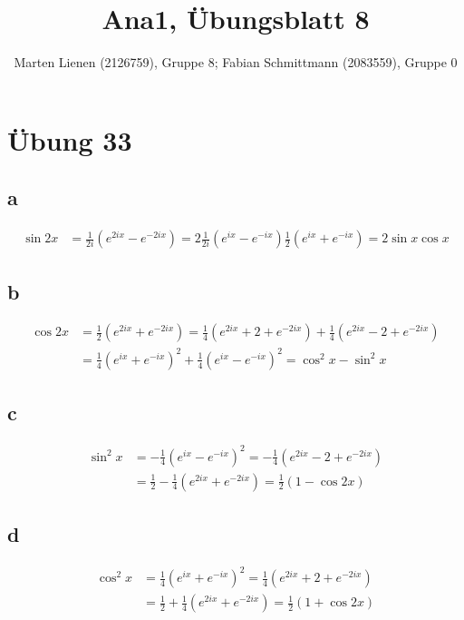 \documentclass[a4paper,10pt]{article}
\title{Ana1, Übungsblatt 8}
\author{Marten Lienen (2126759), Gruppe 8; Fabian Schmittmann (2083559), Gruppe 0}
\begin{document}
\maketitle

\section*{Übung 33}

\subsection*{a}

\begin{align*}
 \sin{2x} & = \frac{1}{2i}(e^{2ix} - e^{-2ix}) = 2\frac{1}{2i}(e^{ix} - e^{-ix})\frac{1}{2}(e^{ix} + e^{-ix}) = 2\sin{x}\cos{x}
\end{align*}

\subsection*{b}

\begin{align*}
 \cos{2x} & = \frac{1}{2}(e^{2ix} + e^{-2ix}) = \frac{1}{4}(e^{2ix} + 2 + e^{-2ix}) + \frac{1}{4}(e^{2ix} - 2 + e^{-2ix}) \\
 & = \frac{1}{4}(e^{ix} + e^{-ix})^2 + \frac{1}{4}(e^{ix} - e^{-ix})^2 = \cos^2 x - \sin^2 x
\end{align*}

\subsection*{c}

\begin{align*}
 \sin^2 x & = -\frac{1}{4}(e^{ix} - e^{-ix})^2 = -\frac{1}{4}(e^{2ix} - 2 + e^{-2ix})\\
 & = \frac{1}{2} - \frac{1}{4}(e^{2ix} + e^{-2ix})= \frac{1}{2}(1 - \cos 2x)
\end{align*}

\subsection*{d}

\begin{align*}
 \cos^2 x & = \frac{1}{4}(e^{ix} + e^{-ix})^2 = \frac{1}{4}(e^{2ix} + 2 + e^{-2ix})\\
 & = \frac{1}{2} + \frac{1}{4}(e^{2ix} + e^{-2ix}) = \frac{1}{2}(1 + \cos 2x)
\end{align*}
\end{document}
